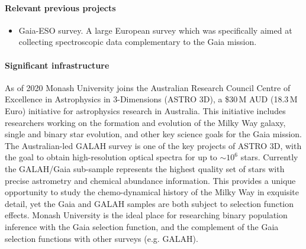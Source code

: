 \paragraph{Relevant previous projects}

\begin{itemize}
    \item Gaia-ESO survey. A large European survey which was specifically aimed at collecting spectroscopic data complementary to the Gaia mission.
\end{itemize}

\paragraph{Significant infrastructure}
As of 2020 Monash University joins the Australian Research Council Centre of Excellence in Astrophysics in 3-Dimensions (ASTRO 3D), a \$30\,M AUD (18.3\,M Euro) initiative for astrophysics research in Australia. This initiative includes researchers working on the formation and evolution of the Milky Way galaxy, single and binary star evolution, and other key science goals for the Gaia mission. The Australian-led GALAH survey is one of the key projects of ASTRO 3D, with the goal to obtain high-resolution optical spectra for up to $\sim10^6$ stars. Currently the GALAH/Gaia sub-sample represents the highest quality set of stars with precise astrometry and chemical abundance information. This provides a unique opportunity to study the chemo-dynamical history of the Milky Way in exquisite detail, yet the Gaia and GALAH samples are both subject to selection function effects. Monash University is the ideal place for researching binary population inference with the Gaia selection function, and the complement of the Gaia selection functions with other surveys (e.g. GALAH).
